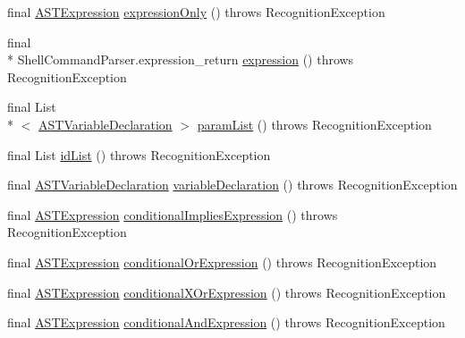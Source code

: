 \begin{DoxyCompactItemize}
final \hyperlink{classorg_1_1tzi_1_1use_1_1parser_1_1ocl_1_1_a_s_t_expression}{A\-S\-T\-Expression} \hyperlink{classorg_1_1tzi_1_1use_1_1parser_1_1shell_1_1_shell_command_parser_a2e94cd42dd02181b068a164627dac5c8}{expression\-Only} ()  throws Recognition\-Exception 
\item 
final \\*
Shell\-Command\-Parser.\-expression\-\_\-return \hyperlink{classorg_1_1tzi_1_1use_1_1parser_1_1shell_1_1_shell_command_parser_a671af13caa094619a5cb7bfc854cab2c}{expression} ()  throws Recognition\-Exception 
\item 
final List\\*
$<$ \hyperlink{classorg_1_1tzi_1_1use_1_1parser_1_1ocl_1_1_a_s_t_variable_declaration}{A\-S\-T\-Variable\-Declaration} $>$ \hyperlink{classorg_1_1tzi_1_1use_1_1parser_1_1shell_1_1_shell_command_parser_a9ceafade22ce6c403d547b0907ec3740}{param\-List} ()  throws Recognition\-Exception 
\item 
final List \hyperlink{classorg_1_1tzi_1_1use_1_1parser_1_1shell_1_1_shell_command_parser_a56ee86c480d3e86eabc9dba5d7ee1264}{id\-List} ()  throws Recognition\-Exception 
\item 
final \hyperlink{classorg_1_1tzi_1_1use_1_1parser_1_1ocl_1_1_a_s_t_variable_declaration}{A\-S\-T\-Variable\-Declaration} \hyperlink{classorg_1_1tzi_1_1use_1_1parser_1_1shell_1_1_shell_command_parser_af894712b1b3e4f60837c3998022cfd75}{variable\-Declaration} ()  throws Recognition\-Exception 
\item 
final \hyperlink{classorg_1_1tzi_1_1use_1_1parser_1_1ocl_1_1_a_s_t_expression}{A\-S\-T\-Expression} \hyperlink{classorg_1_1tzi_1_1use_1_1parser_1_1shell_1_1_shell_command_parser_ab34bdaa747f925ff31619d4bce09e6b9}{conditional\-Implies\-Expression} ()  throws Recognition\-Exception 
\item 
final \hyperlink{classorg_1_1tzi_1_1use_1_1parser_1_1ocl_1_1_a_s_t_expression}{A\-S\-T\-Expression} \hyperlink{classorg_1_1tzi_1_1use_1_1parser_1_1shell_1_1_shell_command_parser_a9201da834fd1b97bf50d22228e0bb900}{conditional\-Or\-Expression} ()  throws Recognition\-Exception 
\item 
final \hyperlink{classorg_1_1tzi_1_1use_1_1parser_1_1ocl_1_1_a_s_t_expression}{A\-S\-T\-Expression} \hyperlink{classorg_1_1tzi_1_1use_1_1parser_1_1shell_1_1_shell_command_parser_adde0650928ef13e8f4885da47b5ae202}{conditional\-X\-Or\-Expression} ()  throws Recognition\-Exception 
\item 
final \hyperlink{classorg_1_1tzi_1_1use_1_1parser_1_1ocl_1_1_a_s_t_expression}{A\-S\-T\-Expression} \hyperlink{classorg_1_1tzi_1_1use_1_1parser_1_1shell_1_1_shell_command_parser_a293e77f5cbf2b9861b1dc57cfa1c3703}{conditional\-And\-Expression} ()  throws Recognition\-Exception 

\end{DoxyCompactItemize}
